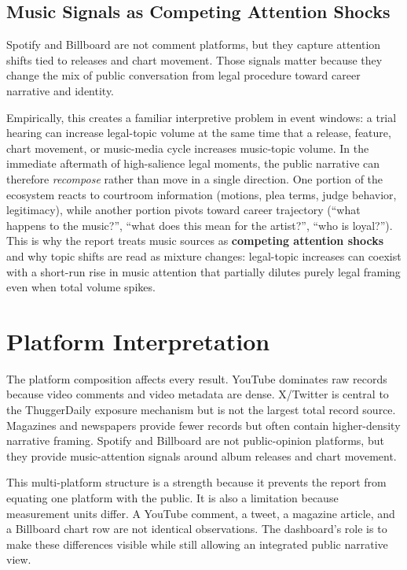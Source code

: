 \documentclass[12pt]{article}
\begin{document}
\subsection{Music Signals as Competing Attention Shocks}
Spotify and Billboard are not comment platforms, but they capture attention shifts tied to releases and chart movement. Those signals matter because they change the mix of public conversation from legal procedure toward career narrative and identity.

Empirically, this creates a familiar interpretive problem in event windows: a trial hearing can increase legal-topic volume at the same time that a release, feature, chart movement, or music-media cycle increases music-topic volume. In the immediate aftermath of high-salience legal moments, the public narrative can therefore \emph{recompose} rather than move in a single direction. One portion of the ecosystem reacts to courtroom information (motions, plea terms, judge behavior, legitimacy), while another portion pivots toward career trajectory (``what happens to the music?'', ``what does this mean for the artist?'', ``who is loyal?''). This is why the report treats music sources as \textbf{competing attention shocks} and why topic shifts are read as mixture changes: legal-topic increases can coexist with a short-run rise in music attention that partially dilutes purely legal framing even when total volume spikes.

\section{Platform Interpretation}
The platform composition affects every result. YouTube dominates raw records because video comments and video metadata are dense. X/Twitter is central to the ThuggerDaily exposure mechanism but is not the largest total record source. Magazines and newspapers provide fewer records but often contain higher-density narrative framing. Spotify and Billboard are not public-opinion platforms, but they provide music-attention signals around album releases and chart movement.

This multi-platform structure is a strength because it prevents the report from equating one platform with the public. It is also a limitation because measurement units differ. A YouTube comment, a tweet, a magazine article, and a Billboard chart row are not identical observations. The dashboard's role is to make these differences visible while still allowing an integrated public narrative view.
\end{document}
